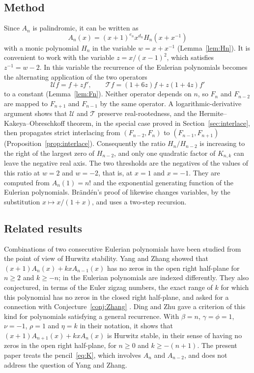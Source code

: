 \documentclass{amsart}
\theoremstyle{remark}
\numberwithin{equation}{section}
\newcommand{\cU}{\mathcal{U}}
\newcommand{\cT}{\mathcal{T}}
\begin{document}
\subsection*{Method}
Since $A_n$ is palindromic, it can be written as
\[
A_n(x)=(x+1)^{e_n}x^{d_n}H_n(x+x^{-1})
\]
with a monic polynomial $H_n$ in the variable $w=x+x^{-1}$
(Lemma~\ref{lem:Hn}). It is convenient to work
with the variable $z=x/(x-1)^2$, which satisfies $z^{-1}=w-2$. In this
variable the recurrence of the Eulerian polynomials becomes the alternating
application of the two operators
\[
\cU f=f+zf',\qquad \cT f=(1+6z)f+z(1+4z)f'
\]
to a constant (Lemma~\ref{lem:Fn}). Neither operator depends on $n$, so
$F_n$ and $F_{n-2}$ are mapped to $F_{n+1}$ and $F_{n-1}$ by the same
operator. A logarithmic-derivative argument shows that $\cU$ and $\cT$
preserve real-rootedness, and the Hermite--Kakeya--Obreschkoff theorem, in
the special case proved in Section~\ref{sec:interlace}, then propagates
strict interlacing from $(F_{n-2},F_n)$ to $(F_{n-1},F_{n+1})$
(Proposition~\ref{prop:interlace}). Consequently the ratio $H_n/H_{n-2}$ is
increasing to the right of the largest zero of $H_{n-2}$, and only one
quadratic factor of $K_{n,k}$ can leave the negative real axis. The two
thresholds are the negatives of the values of this ratio at $w=2$ and
$w=-2$, that is, at $x=1$ and $x=-1$. They are computed from $A_n(1)=n!$
and the exponential generating function of the Eulerian polynomials.
Br\"and\'en's proof of \cite[Theorem 5.2]{Branden} likewise changes
variables, by the substitution $x\mapsto x/(1+x)$, and uses a two-step
recursion.

\subsection*{Related results}
Combinations of two consecutive Eulerian polynomials have been studied from
the point of view of Hurwitz stability. Yang and Zhang
\cite[Theorem 2.3]{YangZhang} showed that $(x+1)A_n(x)+kxA_{n-1}(x)$ has no
zeros in the open right half-plane for $n\ge 2$ and $k\ge -n$; in
\cite{YangZhang} the Eulerian polynomials are indexed differently. They also
conjectured, in terms of the Euler zigzag numbers, the exact range of $k$
for which this polynomial has no zeros in the closed right half-plane, and
asked for a connection with Conjecture~\ref{conj:Zhang}
\cite[Conjecture 3.2 and the remark following it]{YangZhang}. Ding and Zhu
\cite[Proposition 2.17]{DingZhu} gave a criterion of this kind for
polynomials satisfying a general recurrence. With $\beta=n$,
$\gamma=\phi=1$, $\nu=-1$, $\rho=1$ and $\eta=k$ in their notation, it shows
that $(x+1)A_{n+1}(x)+kxA_n(x)$ is Hurwitz stable, in their sense of having
no zeros in the open right half-plane, for $n\ge 0$ and $k\ge -(n+1)$. The
present paper treats the pencil~\eqref{eq:K}, which involves $A_n$ and
$A_{n-2}$, and does not address the question of Yang and Zhang.
\end{document}
